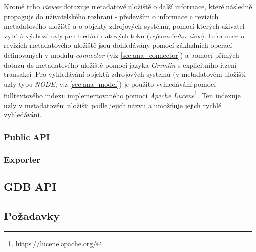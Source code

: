 Kromě toho \textit{viewer} dotazuje metadatové uložiště o další informace, které následně propaguje do uživatelského rozhraní - především o informace o revizích metadatového uložiště a o objekty zdrojových systémů, pomocí kterých uživatel vybírá výchozí uzly pro hledání datových toků (\textit{referenčního view}). Informace o revizích metadatového uložiště jsou dohledávány pomocí základních operací definovaných v modulu \textit{connector} (viz \ref{sec:ana_connector}) a pomocí přímých dotazů do metadatového uložiště pomocí jazyka \textit{Gremlin} s explicitního řízení transakcí. Pro vyhledávání objektů zdrojových systémů (v metadatovém uložišti uzly typu \textit{NODE}, viz \ref{sec:ana_model}) je použito vyhledávání pomocí fulltextového indexu implementovaného pomocí \textit{Apache Lucene}\footnote{\url{https://lucene.apache.org/}}. Ten indexuje uzly v metadatovém uložišti podle jejich názvu a umožňuje jejich rychlé vyhledávání. 


\subsubsection{Public API}




\subsubsection{Exporter}



\subsection{GDB API} %

\subsection{Požadavky}



